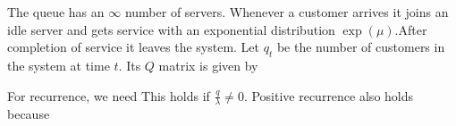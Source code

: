 \documentclass[all-lectures.tex]{subfiles}
\begin{document}
%
\begin{exmp}
	The queue has an $\infty$ number of servers. Whenever a customer arrives it joins an idle server and gets service with an exponential distribution $\exp(\mu)$.After completion of service it leaves the system. 
Let $q_t$ be the number of customers in the system at time $t$.
Its $Q$ matrix is given by

For recurrence, we need
This holds if $\frac{q}{\lambda} \neq 0$. Positive recurrence also holds because
\end{exmp}
\end{document}
